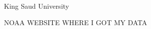 
\begin{thebibliography}{9}

King Saud University






NOAA WEBSITE WHERE I GOT MY DATA








\end{thebibliography}
